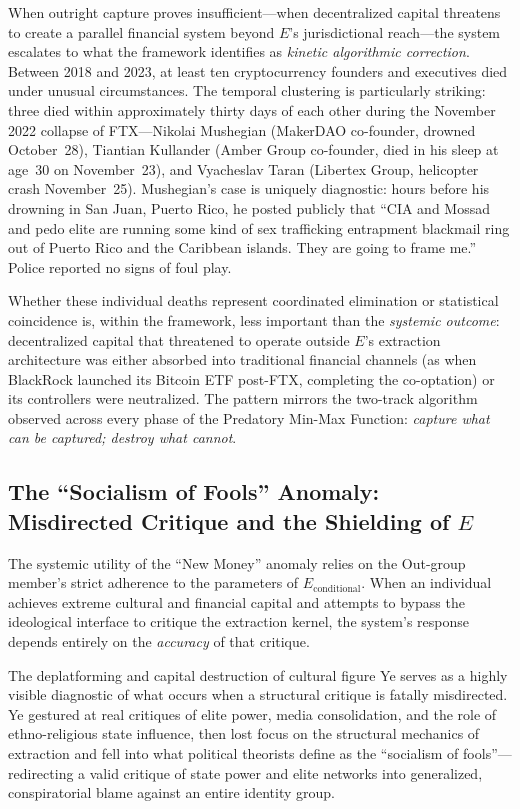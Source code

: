 When outright capture proves insufficient---when decentralized capital threatens to create a parallel financial system beyond $E$'s jurisdictional reach---the system escalates to what the framework identifies as \textit{kinetic algorithmic correction}. Between 2018 and 2023, at least ten cryptocurrency founders and executives died under unusual circumstances. The temporal clustering is particularly striking: three died within approximately thirty days of each other during the November 2022 collapse of FTX---Nikolai Mushegian (MakerDAO co-founder, drowned October~28), Tiantian Kullander (Amber Group co-founder, died in his sleep at age~30 on November~23), and Vyacheslav Taran (Libertex Group, helicopter crash November~25). Mushegian's case is uniquely diagnostic: hours before his drowning in San Juan, Puerto Rico, he posted publicly that ``CIA and Mossad and pedo elite are running some kind of sex trafficking entrapment blackmail ring out of Puerto Rico and the Caribbean islands. They are going to frame me.'' Police reported no signs of foul play.

Whether these individual deaths represent coordinated elimination or statistical coincidence is, within the framework, less important than the \textit{systemic outcome}: decentralized capital that threatened to operate outside $E$'s extraction architecture was either absorbed into traditional financial channels (as when BlackRock launched its Bitcoin ETF post-FTX, completing the co-optation) or its controllers were neutralized. The pattern mirrors the two-track algorithm observed across every phase of the Predatory Min-Max Function: \textit{capture what can be captured; destroy what cannot}.

\subsection{The ``Socialism of Fools'' Anomaly: Misdirected Critique and the Shielding of $E$}

The systemic utility of the ``New Money'' anomaly relies on the Out-group member's strict adherence to the parameters of $E_{\text{conditional}}$. When an individual achieves extreme cultural and financial capital and attempts to bypass the ideological interface to critique the extraction kernel, the system's response depends entirely on the \textit{accuracy} of that critique.

The deplatforming and capital destruction of cultural figure Ye serves as a highly visible diagnostic of what occurs when a structural critique is fatally misdirected. Ye gestured at real critiques of elite power, media consolidation, and the role of ethno-religious state influence, then lost focus on the structural mechanics of extraction and fell into what political theorists define as the ``socialism of fools''---redirecting a valid critique of state power and elite networks into generalized, conspiratorial blame against an entire identity group.

